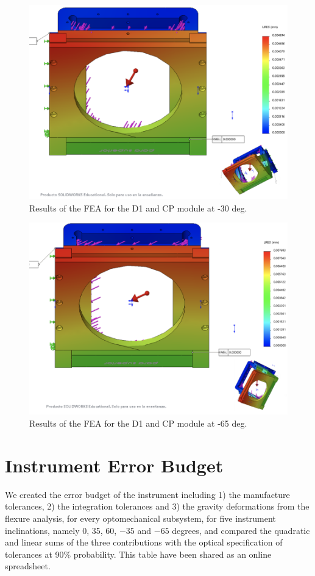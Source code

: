 \documentclass{report}
\begin{document}
\begin{figure}
\centering
\includegraphics[width=0.8\linewidth]{figures/FEAtower-30.png}
\caption{Results of the FEA for the D1 and CP module at -30 deg.}
\label{figure:FEALtower-30}
\end{figure}

\begin{figure}
\centering
\includegraphics[width=0.8\linewidth]{figures/FEAtower-65.png}
\caption{Results of the FEA for the D1 and CP module at -65 deg.}
\label{figure:FEALtower-65}
\end{figure}

\clearpage

\section{Instrument Error Budget}
\label{InstrumentEB}

We created the error budget of the instrument including 1) the manufacture tolerances, 2) the integration tolerances and 3) the gravity deformations from the flexure analysis, for every optomechanical subsystem, for five instrument inclinations, namely 0, 35, 60, $-35$ and $-65$ degrees, and compared the quadratic and linear sums of the three contributions with the optical specification of tolerances at 90\% probability. This table have been shared as an online spreadsheet.
\end{document}
